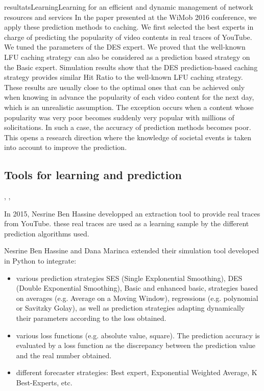 \documentclass{ra2016}
\begin{document}
\begin{module}{resultats}{Learning}{Learning for an efficient and dynamic management of network resources and services}
In the paper presented at the WiMob 2016 conference, we apply these prediction methods to caching. We first selected the best experts in charge of predicting the popularity of video
contents in real traces of YouTube. We tuned the parameters of the DES expert. We proved that the well-known LFU caching strategy can also be considered as a prediction based strategy
on the Basic expert. Simulation results show that the DES prediction-based caching strategy provides similar Hit Ratio to the well-known LFU caching strategy. These results are usually close to the optimal ones that can be achieved only when knowing in advance the popularity
of each video content for the next day, which is an unrealistic assumption. The exception occurs when a content whose popularity was very poor becomes suddenly very popular with millions of solicitations. In such a case, the accuracy of prediction methods becomes poor. This opens a research direction where the knowledge of societal events is taken into account to improve the prediction.

\subsection{Tools for learning and prediction}
\begin{participants}
,
,
\end{participants}

In 2015, Nesrine Ben Hassine developped an extraction tool to provide real traces from YouTube. these real traces are used as a learning sample by the different prediction algorithms used.

Nesrine Ben Hassine and Dana Marinca extended their simulation tool developed in Python to integrate:
\begin{itemize}
\item various prediction strategies SES (Single Explonential Smoothing), DES (Double Exponential Smoothing), Basic and enhanced basic, strategies based on averages (e.g. Average on a Moving Window), regressions (e.g. polynomial or Savitzky Golay), as well as prediction strategies adapting dynamically their parameters according to the loss obtained.
\item various loss functions (e.g. absolute value, square). The prediction accuracy is evaluated by a loss function as the discrepancy between the prediction value and the real number obtained. 
\item different forecaster strategies: Best expert, Exponential Weighted Average, K Best-Experts, etc.
\end{itemize}


\end{module}
\end{document}
